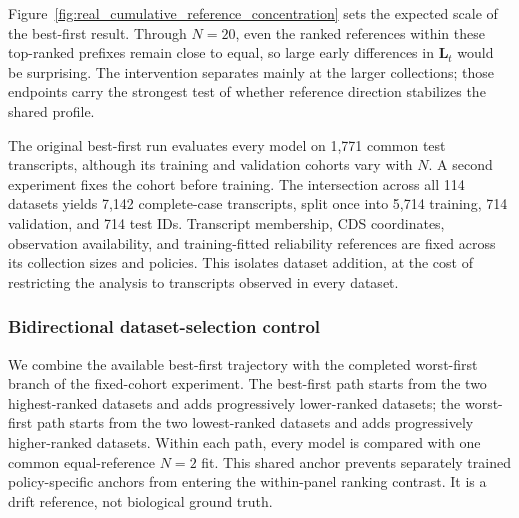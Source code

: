 Figure~\ref{fig:real_cumulative_reference_concentration} sets the expected
scale of the best-first result.  Through $N=20$, even the ranked references
within these top-ranked prefixes remain close to equal, so large early
differences in $\mathbf{L}_t$ would be surprising.  The intervention separates
mainly at the larger collections; those endpoints carry the strongest test of
whether reference direction stabilizes the shared profile.

The original best-first run evaluates every model on 1,771 common test
transcripts, although its training and validation cohorts vary with $N$.  A
second experiment fixes the cohort before training.  The intersection across
all 114 datasets yields 7,142 complete-case transcripts, split once into 5,714
training, 714 validation, and 714 test IDs.  Transcript membership, CDS
coordinates, observation availability, and training-fitted reliability
references are fixed across its collection sizes and policies.  This isolates
dataset addition, at the cost of restricting the analysis to transcripts
observed in every dataset.

\subsubsection{Bidirectional dataset-selection control}
\label{sec:real_selection_controls}

We combine the available best-first trajectory with the completed worst-first
branch of the fixed-cohort experiment.  The best-first path starts from the two
highest-ranked datasets and adds progressively lower-ranked datasets; the
worst-first path starts from the two lowest-ranked datasets and adds
progressively higher-ranked datasets.  Within each path, every model is
compared with one common equal-reference $N=2$ fit.  This shared anchor prevents
separately trained policy-specific anchors from entering the within-panel
ranking contrast.  It is a drift reference, not biological ground truth.


